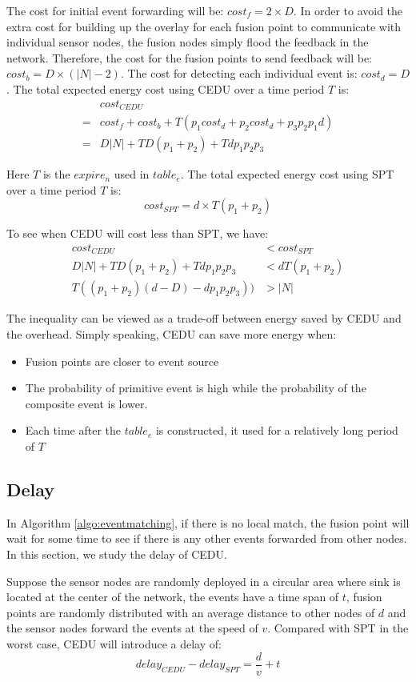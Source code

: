 The cost for initial event forwarding will be: \(cost_f=2\times D\). In order to avoid the extra cost for building up the overlay for each fusion point to communicate with individual sensor nodes, the fusion nodes simply flood the feedback in the network. Therefore, the cost for the fusion points to send feedback will be: \(cost_b=D\times(|N|-2)\). The cost for detecting each individual event is: \(cost_d=D\). The total expected energy cost using CEDU over a time period \(T\) is:
\begin{align*}
&cost_{CEDU}\\
=&cost_f+cost_b+T(p_1cost_d+p_2cost_d+p_3p_2p_1d)\\
=&D|N|+TD(p_1+p_2)+Tdp_1p_2p_3
\end{align*}

Here \(T\) is the \(expire_n\) used in \(table_e\). The total expected energy cost using SPT over a time period \(T\) is:
\begin{equation*}
cost_{SPT}=d\times T(p_1+p_2)
\end{equation*}

To see when CEDU will cost less than SPT, we have:
\begin{align*}
cost_{CEDU}&<cost_{SPT}\\
D|N|+TD(p_1+p_2)+Tdp_1p_2p_3&<dT(p_1+p_2)\\
T((p_1+p_2)(d-D)-dp_1p_2p_3))&>|N|
\end{align*}

The inequality can be viewed as a trade-off between energy saved by CEDU and the overhead. Simply speaking, CEDU can save more energy when:
\begin{itemize}
\item Fusion points are closer to event source
\item The probability of primitive event is high while the probability of the composite event is lower.
\item Each time after the \(table_e\) is constructed, it used for a relatively long period of \(T\) 
\end{itemize}

\subsection{Delay}
In Algorithm \ref{algo:eventmatching}, if there is no local match, the fusion point will wait for some time to see if there is any other events forwarded from other nodes. In this section, we study the delay of CEDU.
\begin{theorem}
\label{thm:delay}
Suppose the sensor nodes are randomly deployed in a circular area where sink is located at the center of the network, the events have a time span of \(t\), fusion points are randomly distributed with an average distance to other nodes of \(d\) and the sensor nodes forward the events at the speed of \(v\). Compared with SPT in the worst case, CEDU will introduce a delay of:
\begin{equation*}
delay_{CEDU}-delay_{SPT}=\frac{d}{v}+t
\end{equation*}
\end{theorem}

